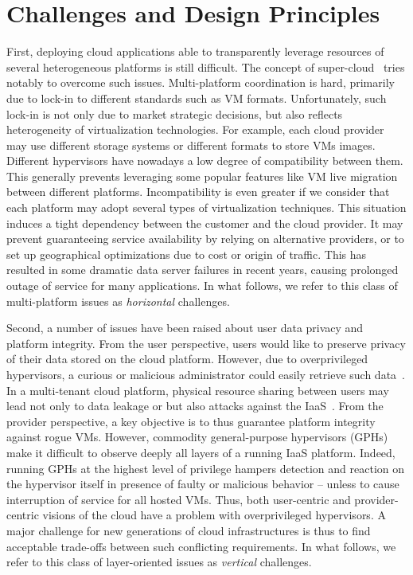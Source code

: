 \documentclass{sig-alternate}
\begin{document}
\section{Challenges and Design Principles}
\label{ref:challenges}

First, deploying cloud applications able to transparently leverage resources of several heterogeneous platforms is still difficult. The concept of super-cloud~\cite{art:blan, xclo:blank} tries notably to overcome such issues. Multi-platform coordination is hard, primarily due to lock-in to different standards such as VM formats. Unfortunately, such lock-in is not only due to market strategic decisions, but also reflects heterogeneity of virtualization technologies. For example, each cloud provider may use different storage systems or different formats to store VMs images. Different hypervisors have nowadays a low degree of compatibility between them. This generally prevents leveraging some popular features like VM live migration between different platforms. Incompatibility is even greater if we consider that each platform may adopt several types of virtualization techniques. This situation induces a tight dependency between the customer and the cloud provider. It may prevent guaranteeing service availability by relying on alternative providers, or to set up geographical optimizations due to cost or origin of traffic. This has resulted in some dramatic data server failures in recent years, causing prolonged outage of service for many applications. In what follows, we refer to this class of multi-platform issues as \textit{horizontal} challenges.

Second, a number of issues have been raised about user data privacy and platform integrity. From the user perspective, users would like to preserve privacy of their data stored on the cloud platform. However, due to overprivileged hypervisors, a curious or malicious administrator could easily retrieve such data~\cite{cloudvisor:zhang}. In a multi-tenant cloud platform, physical resource sharing between users may lead not only to data leakage or but also attacks against the IaaS~\cite{bot:att, sec:you}.
From the provider perspective, a key objective is to thus guarantee platform integrity against rogue VMs. However, commodity general-purpose hypervisors (GPHs) make it difficult to observe deeply all layers of a running IaaS platform. Indeed, running GPHs at the highest level of privilege hampers detection and reaction on the hypervisor itself in presence of faulty or malicious behavior -- unless to cause interruption of service for all hosted VMs. Thus, both user-centric and provider-centric visions of the cloud have a problem with overprivileged hypervisors.
A major challenge for new generations of cloud infrastructures is thus to find acceptable trade-offs between such conflicting requirements. In what follows, we refer to this class of layer-oriented issues as \textit{vertical} challenges.
\end{document}
